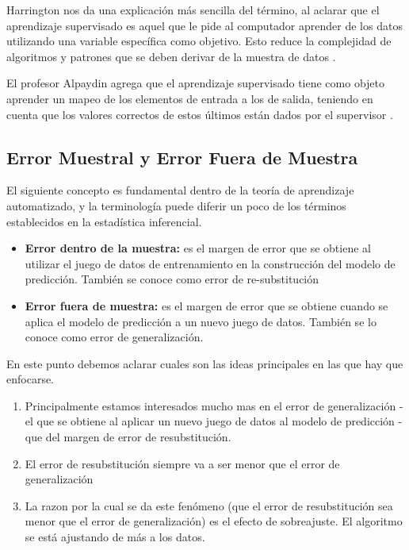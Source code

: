 \begin{spacing}{1.5}
Harrington nos da una explicación más sencilla del término, al aclarar que el aprendizaje supervisado es aquel que le pide al computador aprender de los datos utilizando una variable específica como objetivo. Esto reduce la complejidad de algoritmos y patrones que se deben derivar de la muestra de datos \cite{harrington}. 

El profesor Alpaydin agrega que el aprendizaje supervisado tiene como objeto aprender un mapeo de los elementos de entrada a los de salida, teniendo en cuenta que los valores correctos de estos últimos están dados por el supervisor \cite{alpaydin}.

\subsection{Error Muestral y Error Fuera de Muestra}
El siguiente concepto es fundamental dentro de la teoría de aprendizaje automatizado, y la terminología puede diferir un poco de los términos establecidos en la estadística inferencial.

	\begin{itemize}
		\item \textbf{Error dentro de la muestra:} es el margen de error que se obtiene al utilizar el juego de datos de entrenamiento en la construcción del modelo de predicción. También se conoce como error de re-substitución 
		\item  \textbf{Error fuera de muestra:} es el margen de error que se obtiene cuando se aplica el modelo de predicción a un nuevo juego de datos. También se lo conoce como error de generalización. 
	\end{itemize}


En este punto debemos aclarar cuales son las ideas principales en las que hay que enfocarse. 

\begin{enumerate}
	\item Principalmente estamos interesados mucho mas en el error de generalización - el que se obtiene al aplicar un nuevo juego de datos al modelo de predicción - que del margen de error de resubstitución.
	\item El error de resubstitución siempre va a ser menor que el error de generalización 
	\item La razon por la cual se da este fenómeno (que el error de resubstitución sea menor que el error de generalización) es el efecto de sobreajuste. El algoritmo se está ajustando de más a los datos.
\end{enumerate}


\end{spacing}
